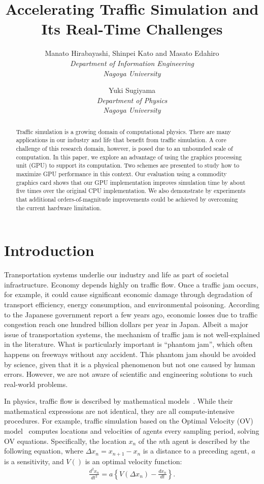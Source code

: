 \documentclass[times, 10pt, twocolumn]{article}
\title{Accelerating Traffic Simulation and Its Real-Time Challenges}
\author {
Manato Hirabayashi, Shinpei Kato and Masato Edahiro\\
\textit{Department of Information Engineering}\\
\textit{Nagoya University}\\
\and
Yuki Sugiyama\\
\textit{Department of Physics}\\
\textit{Nagoya University}\\
}
\begin{document}
\maketitle


\begin{abstract}
 Traffic simulation is a growing domain of computational physics.
 There are many applications in our industry and life that benefit from
 traffic simulation.
 A core challenge of this research domain, however, is posed due to
 an unbounded scale of computation.
 In this paper, we explore an advantage of using the graphics processing
 unit (GPU) to support its computation.
 Two schemes are presented to study how to maximize GPU
 performance in this context.
 Our evaluation using a commodity graphics card shows that our GPU
 implementation improves simulation time by about five times over the
 original CPU implementation.
 We also demonstrate by experiments that additional orders-of-magnitude
 improvements could be achieved by overcoming the current hardware
 limitation.
\end{abstract}

\section{Introduction}

Transportation systems underlie our industry and life as part of
societal infrastructure.
Economy depends highly on traffic flow.
Once a traffic jam occurs, for example, it could cause significant
economic damage through degradation of transport efficiency, energy
consumption, and environmental poisoning.
According to the Japanese government report a few years ago, economic
losses due to traffic congestion reach one hundred billion dollars per
year in Japan.
Albeit a major issue of transportation systems, the mechanism of traffic
jam is not well-explained in the literature.
What is particularly important is ``phantom jam'', which often happens
on freeways without any accident.
This phantom jam should be avoided by science, given that it is
a physical phenomenon but not one caused by human errors.
However, we are not aware of scientific and engineering solutions to
such real-world problems.

In physics, traffic flow is described by mathematical
models~\cite{Bando1995, Kerner1993, Nagel1992}.
While their mathematical expressions are not identical, they are all
compute-intensive procedures.
For example, traffic simulation based on the Optimal Velocity (OV)
model~\cite{Bando1995} computes locations and velocities of agents every
sampling period, solving OV equations. 
Specifically, the location $x_n$ of the $n$th agent is described by the
following equation, where $\Delta x_n = x_{n+1} - x_n$ is a distance to
a preceding agent, $a$ is a sensitivity, and $V()$ is an optimal
velocity function:
\begin{eqnarray}
 \label{eqn:ov}
 \frac{d^2 x_n}{d t^2} = a \left\{V(\Delta x_n) - \frac{d x_n}{d t}\right\}.
\end{eqnarray}
\end{document}
